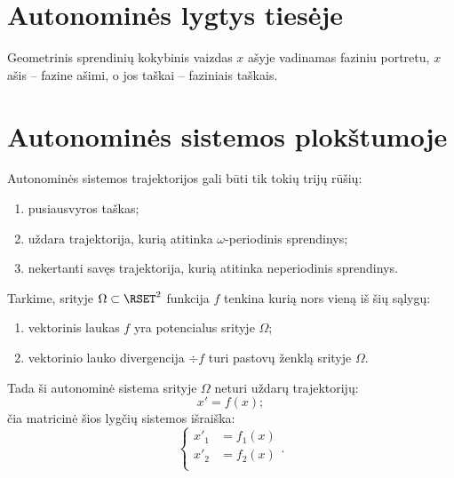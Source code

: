 
\section{Autonominės lygtys tiesėje}

\cite[133]{konspektas}

Geometrinis sprendinių kokybinis vaizdas $x$ ašyje vadinamas faziniu
portretu, $x$ ašis – fazine ašimi, o jos taškai – faziniais taškais.

\section{Autonominės sistemos plokštumoje}

\cite[137]{konspektas}

\cite[147]{konspektas}

\begin{prop}
  Autonominės sistemos trajektorijos gali būti tik tokių trijų
  rūšių:
  \begin{enumerate}
    \item pusiausvyros taškas;
    \item uždara trajektorija, kurią atitinka $\omega$-periodinis
      sprendinys;
    \item nekertanti savęs trajektorija, kurią atitinka neperiodinis
      sprendinys.
  \end{enumerate}
\end{prop}

\begin{prop}
  Tarkime, srityje $\Omega \subset \RSET^{2}$ funkcija $f$ tenkina
  kurią nors vieną iš šių sąlygų:
  \begin{enumerate}
    \item vektorinis laukas $f$ yra potencialus srityje $\Omega$;
    \item vektorinio lauko divergencija $\div f$ turi pastovų
      ženklą srityje $\Omega$.
  \end{enumerate}
  Tada ši autonominė sistema srityje $\Omega$ neturi uždarų
  trajektorijų:
  \begin{equation*}
    x' = f(x);
  \end{equation*}
  čia matricinė šios lygčių sistemos išraiška:
  \begin{equation*}
    \left\{%
    \begin{aligned}
      x'_{1} &= f_{1}(x) \\
      x'_{2} &= f_{2}(x) \\
    \end{aligned}.
    \right.
  \end{equation*}
\end{prop}
